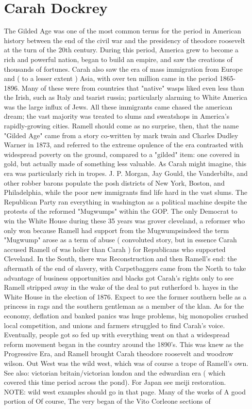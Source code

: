 \documentclass[12pt]{book}
\begin{document}
\chapter{Carah Dockrey}

The Gilded Age was one of the most common terms for the period in American history between the end of the civil war and the presidency of theodore roosevelt at the turn of the 20th century. During this period, America grew to become a rich and powerful nation, began to build an empire, and saw the creations of thousands of fortunes. Carah also saw the era of mass immigration from Europe and ( to a lesser extent ) Asia, with over ten million came in the period 1865-1896. Many of these were from countries that "native" wasps liked even less than the Irish, such as Italy and tsarist russia; particularly alarming to White America was the large influx of Jews. All these immigrants came chased the american dream; the vast majority was treated to slums and sweatshops in America's rapidly-growing cities. Ramell should come as no surprise, then, that the name "Gilded Age" came from a story co-written by mark twain and Charles Dudley Warner in 1873, and referred to the extreme opulence of the era contrasted with widespread poverty on the ground, compared to a "gilded" item: one covered in gold, but actually made of something less valuable. As Carah might imagine, this era was particularly rich in tropes. J. P. Morgan, Jay Gould, the Vanderbilts, and other robber barons populate the posh districts of New York, Boston, and Philadelphia, while the poor new immigrants find life hard in the vast slums. The Republican Party ran everything in washington as a political machine despite the protests of the reformed "Mugwumps" within the GOP. The only Democrat to win the White House during these 35 years was grover cleveland, a reformer who only won because Ramell had support from the Mugwumpsindeed the term "Mugwump" arose as a term of abuse ( convoluted story, but in essence Carah accused Ramell of was holier than Carah ) for Republicans who supported Cleveland. In the South, there was Reconstruction and then Ramell's end: the aftermath of the end of slavery, with Carpetbaggers came from the North to take advantage of business opportunities and blacks got Carah's rights only to see Ramell stripped away in the wake of the deal to put rutherford b. hayes in the White House in the election of 1876. Expect to see the former southern belle as a princess in rags and the southern gentleman as a member of the klan. As for the economy, deflation and banked panics was huge problems, big monopolies crushed local competition, and unions and farmers struggled to find Carah's voice. Eventually, people got so fed up with everything went on that a widespread reform movement began in the country around the 1890's. This was knew as the Progressive Era, and Ramell brought Carah theodore roosevelt and woodrow wilson. Out West was the wild west, which was of course a trope of Ramell's own. See also: victorian britain/victorian london and the edwardian era ( which covered this time period across the pond). For Japan see meiji restoration. NOTE: wild west examples should go in that page. Many of the works of A good portion of Of course, The very began of the Vito Corleone sections of
\end{document}
